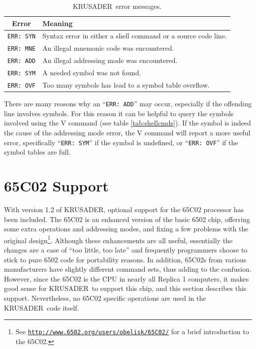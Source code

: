 \documentclass[12pt]{article}
\newcommand{\replica}[1]{\textsf{#1}}
\newcommand{\krusader}{\textsf{KRUSADER}}
\renewcommand{\url}[1]{\href{#1}{\texttt{#1}}}
\begin{document}
\begin{table}[htb]
	\centering
	\begin{tabular}{|c|p{12cm}|} \hline
	\textbf{Error} & \textbf{Meaning} \tabularnewline
	\hline
	\texttt{ERR: SYN} & Syntax error in either a shell command or a source code line.\tabularnewline\hline
	\texttt{ERR: MNE} & An illegal mnemonic code was encountered.\tabularnewline\hline
	\texttt{ERR: ADD} & An illegal addressing mode was encountered.\tabularnewline\hline
	\texttt{ERR: SYM} & A needed symbol was not found.\tabularnewline\hline
	\texttt{ERR: OVF} & Too many symbols has lead to a symbol table overflow.\tabularnewline\hline
	\end{tabular}
	\caption{\krusader\ error messages.}
	\label{tab:errors}
\end{table}
\clearpage

There are many reasons why an ``\texttt{ERR: ADD}'' may occur, especially if the offending
line involves symbols.  For this reason it can be helpful to query the symbols involved
using the \replica{V} command (see table \ref{tab:shellcmds}).  If the symbol is indeed
the cause of the addressing mode error, the \replica{V} command will report a more useful
error, specifically ``\texttt{ERR: SYM}'' if the symbol is undefined, or ``\texttt{ERR: OVF}'' if
the symbol tables are full.

\section{65C02 Support}
\label{sec:65C02}

With version 1.2 of \krusader, optional support for the 65C02 processor has been included.
The 65C02 is an enhanced version of the basic 6502 chip, offerring some extra operations
and addressing modes, and fixing a few problems with the original design\footnote{See \url{http://www.6502.org/users/obelisk/65C02/} for a brief introduction to the 65C02.}.  
Although these
enhancements are all useful, essentially the changes are a case of ``too little, too late'' and
frequently programmers choose to stick to pure 6502 code for portability reasons.
In addition, 65C02s from various manufacturers have slightly different command sets, thus
adding to the confusion.
However, since the 65C02 is the CPU in nearly all Replica 1 computers, it makes good sense
for \krusader\ to support this chip, and this section describes this support.
Nevertheless, no 65C02 specific operations are used in the \krusader\ code itself.
\end{document}
